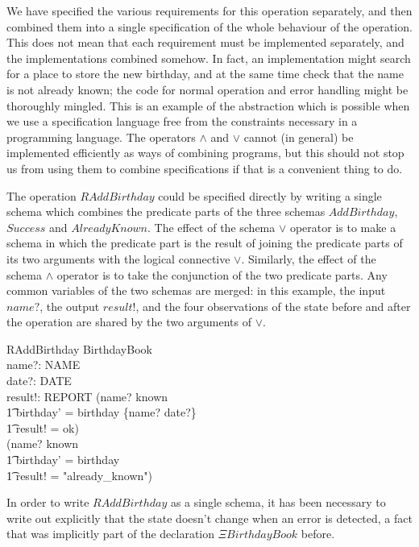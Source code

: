 We have specified the various requirements for this operation separately,
and then combined them into a single specification of the whole
behaviour of the operation. This does not mean that each requirement
must be implemented separately, and the implementations combined
somehow.
In fact, an implementation might search for a place to store the new
birthday, and at the same time check that the name is not already known;
the code for normal operation and error handling might be thoroughly
mingled.
This is an example of the abstraction which is possible when we use a
specification language free from the constraints necessary
in a programming language. The operators $\land$ and $\lor$
cannot (in general) be implemented efficiently as ways of combining
programs, but this should not stop us from using them to combine
specifications if that is a convenient thing to do.

The operation $RAddBirthday$ could be specified directly by writing
a single schema which combines the predicate parts of the three
schemas $AddBirthday$, $Success$ and $AlreadyKnown$.
The effect of the schema $\lor$ operator is to make a schema
in which the predicate part is the result of joining the predicate parts of
its two arguments with the logical connective $\lor$. Similarly, the effect
of the schema $\land$ operator is to take the conjunction of the two
predicate parts.
Any common variables of the two schemas are merged: in this example, the
input $name?$, the output $result!$, and the four observations of the
state before and after the operation are shared by the two arguments of
$\lor$.
\begin{schema}{RAddBirthday}
	\Delta BirthdayBook \\
	name?: NAME \\
	date?: DATE \\
	result!: REPORT
\where
	(name? \notin known \land \\
\t1		birthday' = birthday \cup \{name? \mapsto date?\} \land \\
\t1		result! = ok) \lor \\
	(name? \in known \land \\
\t1		birthday' = birthday \land \\
\t1		result! = "already\_known")
\end{schema}
In order to write $RAddBirthday$ as a single schema, it has been
necessary to write out explicitly that the state doesn't change when
an error is detected, a fact that was implicitly
part of the declaration $\Xi BirthdayBook$ before.

